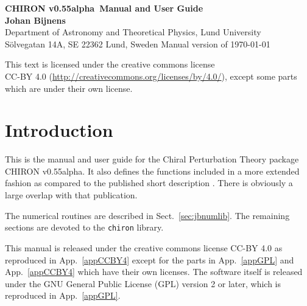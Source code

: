 \documentclass[12pt,a4paper]{article}
\newcommand{\mytt}[1]{\texttt{#1}}
\newcommand{\chironversion}{v0.55alpha}
\newcommand{\versiondate}{\today}
\begin{document}
\begin{titlepage}
\setcounter{page}{-1} %
\phantom{p}
\vfill
\begin{center}
{\large \bf CHIRON \chironversion\ Manual and User Guide}
\\[1cm]
{\bf Johan Bijnens}\\[0.5cm]
{Department of Astronomy and Theoretical Physics, Lund University\\
Sölvegatan 14A, SE 22362 Lund, Sweden}
\vfill
Manual version of \versiondate
\vfill
\end{center}
\begin{abstract}
This manual and user guide describes the classes and functions contained
in the ChPT program collection \textsc{CHIRON}\chironversion\ which includes
the numerical library \mytt{jbnumlib} and the ChPT
routine library \mytt{chiron}.
\end{abstract}
\vfill
\noindent This text is licensed under the creative commons license\\CC-BY 4.0
(\url{http://creativecommons.org/licenses/by/4.0/}), except some parts which are
under their own license.
\end{titlepage}

\tableofcontents

\section{Introduction}
\label{introduction}

This is the manual and user guide for the Chiral Perturbation Theory
package \textsc{CHIRON} \chironversion. It also defines the functions
included in a more extended fashion as compared to the
published short description \cite{Bijnens:2014gsa}. There is obviously
a large overlap with that publication.

The numerical routines are described in Sect.~\ref{sec:jbnumlib}.
The remaining sections are devoted to the \mytt{chiron} library.

This manual is released under the creative commons license CC-BY 4.0
\cite{CClicense}
as reproduced in App.~\ref{appCCBY4} except for the parts
in App.~\ref{appGPL} and App.~\ref{appCCBY4} which have their own licenses.
The software itself is released under the GNU General Public License (GPL)
version 2 or later, which is reproduced in App.~\ref{appGPL}.
\end{document}
